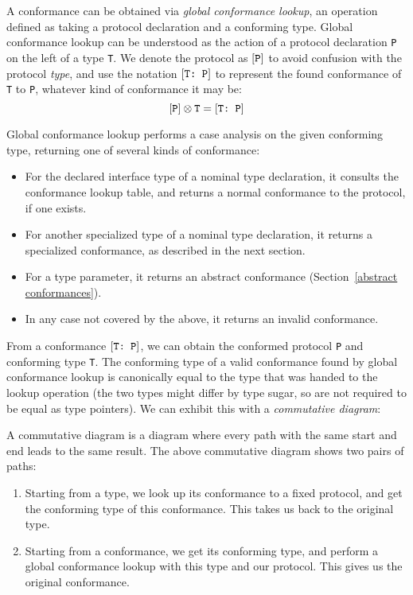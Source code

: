 \documentclass[../generics]{subfiles}
\begin{document}
A conformance can be obtained via \emph{global conformance lookup}, an operation defined as taking a protocol declaration and a conforming type. Global conformance lookup can be understood as the action of a protocol declaration \texttt{P} on the left of a type \texttt{T}. We denote the protocol as $[\texttt{P}]$ to avoid confusion with the protocol \emph{type}, and use the notation $[\texttt{T:~P}]$ to represent the found conformance of \texttt{T} to \texttt{P}, whatever kind of conformance it may be:\index{$\otimes$}
\[[\texttt{P}]\otimes\texttt{T} = [\texttt{T:~P}]\]

Global conformance lookup performs a case analysis on the given conforming type, returning one of several kinds of conformance:
\begin{itemize}
\item For the declared interface type of a nominal type declaration, it consults the conformance lookup table, and returns a normal conformance to the protocol, if one exists.
\item For another specialized type of a nominal type declaration, it returns a specialized conformance, as described in the next section.
\item For a type parameter, it returns an abstract conformance (Section~\ref{abstract conformances}).
\item In any case not covered by the above, it returns an invalid conformance.
\end{itemize}

From a conformance $[\texttt{T:~P}]$, we can obtain the conformed protocol \texttt{P} and conforming type \texttt{T}. The conforming type of a valid conformance found by global conformance lookup is canonically equal to the type that was handed to the lookup operation (the two types might differ by type sugar, so are not required to be equal as type pointers). We can exhibit this with a \emph{commutative diagram}:
\begin{quote}
\end{quote}
A commutative diagram is a diagram where every path with the same start and end leads to the same result. The above commutative diagram shows two pairs of paths:
\begin{enumerate}
\item Starting from a type, we look up its conformance to a fixed protocol, and get the conforming type of this conformance. This takes us back to the original type.
\item Starting from a conformance, we get its conforming type, and perform a global conformance lookup with this type and our protocol. This gives us the original conformance.
\end{enumerate}
\end{document}
